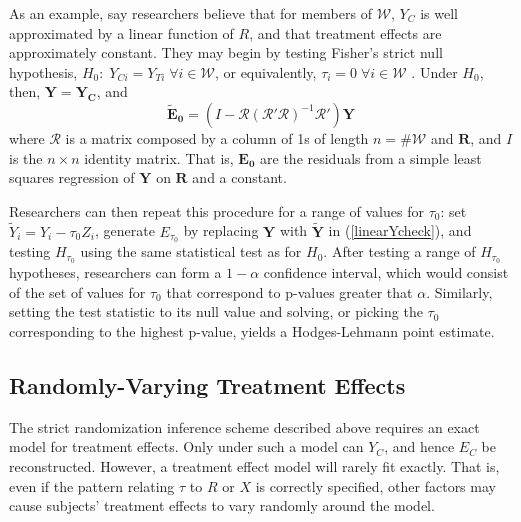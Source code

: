 \documentclass[12pt]{article}
\newcommand{\ych}{E}
\begin{document}
As an example, say researchers believe that for members of
$\mathcal{W}$, $Y_C$ is well approximated by a linear function of $R$,
and that treatment effects are approximately constant.
They may begin by testing Fisher's strict null hypothesis,
$H_0:\;Y_{Ci}=Y_{Ti} \; \forall i \in \mathcal{W}$, or equivalently,
$\tau_i=0 \; \forall i \in \mathcal{W}$ \citep{fisher:1935}.
Under $H_0$, then, $\bm{Y}=\bm{Y_C}$, and
\begin{equation}\label{linearYcheck}
\bm{\tilde{\ych}_0}=(I-\mathcal{R}(\mathcal{R}'\mathcal{R})^{-1}\mathcal{R}')\bm{Y}
\end{equation}
where $\mathcal{R}$ is a matrix composed by a column of 1s of length
$n=\#\mathcal{W}$ and $\bm{R}$, and $I$ is the $n\times n$
identity matrix.
That is, $\bm{\ych_0}$ are the residuals from a simple least
squares regression of $\bm{Y}$ on $\bm{R}$ and a constant.

Researchers can then repeat this procedure for a range of values for
$\tau_0$: set $\tilde{Y}_i=Y_i-\tau_0Z_i$, generate $\ych_{\tau_0}$ by
replacing $\bm{Y}$ with $\bm{\tilde{Y}}$ in
(\ref{linearYcheck}), and testing $H_{\tau_0}$ using the same
statistical test as for $H_0$.
After testing a range of $H_{\tau_0}$ hypotheses, researchers can form
a $1-\alpha$ confidence interval, which would consist of the set of
values for $\tau_0$ that correspond to p-values greater that
$\alpha$.
Similarly, setting the test statistic to its null value and solving,
or picking the $\tau_0$ corresponding to the highest p-value, yields a
Hodges-Lehmann point estimate.

\subsection{Randomly-Varying Treatment Effects}
The strict randomization inference scheme described above requires an
exact model for treatment effects.
Only under such a model can $Y_C$, and hence $\ych_C$ be
reconstructed.
However, a treatment effect model will rarely fit exactly.
That is, even if the pattern relating $\tau$ to $R$ or $X$ is
correctly specified, other factors may cause subjects' treatment
effects to vary randomly around the model.
\end{document}
